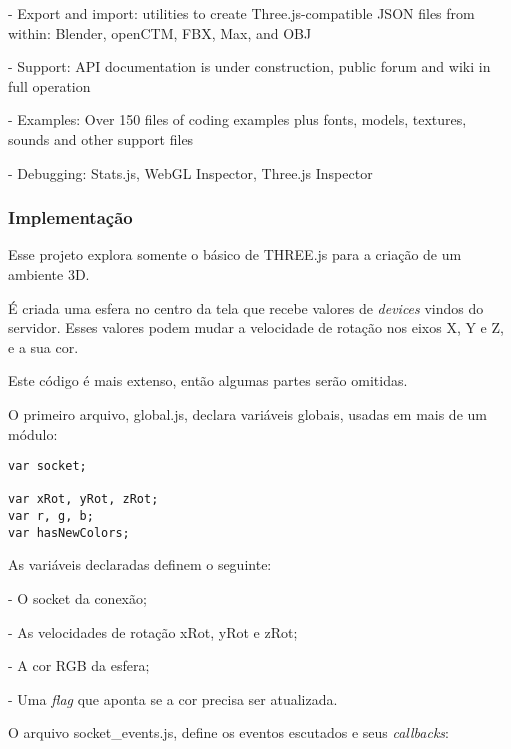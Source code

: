 \documentclass[a4paper,12pt]{article}
\begin{document}
- Export and import: utilities to create Three.js-compatible JSON files from within: Blender, openCTM, FBX, Max, and OBJ

- Support: API documentation is under construction, public forum and wiki in full operation

- Examples: Over 150 files of coding examples plus fonts, models, textures, sounds and other support files

- Debugging: Stats.js, WebGL Inspector, Three.js Inspector



\subsubsection{Implementação}

Esse projeto explora somente o básico de THREE.js para a criação de um ambiente 3D.

É criada uma esfera no  centro da tela que recebe valores de \emph{devices} vindos do servidor. Esses valores podem mudar a velocidade de rotação nos eixos X, Y e Z, e a sua cor.

Este código é mais extenso, então algumas partes serão omitidas.

O primeiro arquivo, global.js, declara variáveis globais, usadas em mais de um módulo:


\begin{small}
\begin{Verbatim}[frame=single]
var socket;

var xRot, yRot, zRot;
var r, g, b;
var hasNewColors;
\end{Verbatim}
\end{small}

As variáveis declaradas definem o seguinte:

- O socket da conexão;

- As velocidades de rotação xRot, yRot e zRot;

- A cor RGB da esfera;

- Uma \emph{flag} que aponta se a cor precisa ser atualizada.


O arquivo socket\_events.js, define os eventos escutados e seus \emph{callbacks}:
\end{document}
